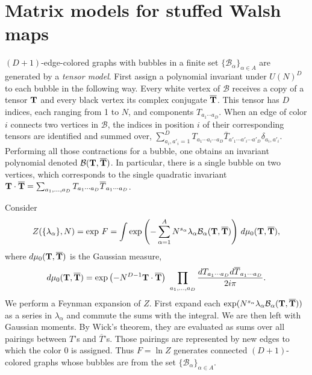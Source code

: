 \documentclass[aps,prd,10pt,notitlepage,nofootinbib,superscriptaddress,showkeys,showpacs]{revtex4-1}
\begin{document}
\section{Matrix models for stuffed Walsh maps} \label{sec:MatrixModel}

$(D+1)$-edge-colored graphs with bubbles in a finite set $\{{\mathcal{B}}_\alpha\}_{\alpha\in A}$ are generated by a \emph{tensor model}. First assign a polynomial invariant under $U(N)^D$ to each bubble in the following way. Every white vertex of ${\mathcal{B}}$ receives a copy of a tensor ${\bf T}$ and every black vertex its complex conjugate ${\bf \overline{T}}$. This tensor has $D$ indices, each ranging from 1 to $N$, and components $T_{a_1 \dotsb a_D}$. When an edge of color $i$ connects two vertices in ${\mathcal{B}}$, the indices in position $i$ of their corresponding tensors are identified and summed over, $\sum_{a_i, a'_i=1}^D T_{a_1\dotsb a_i\dotsb a_D} \bar{T}_{a'_1 \dotsb a'_i \dotsb a'_D} \delta_{a_i, a'_i}$. Performing all those contractions for a bubble, one obtains an invariant polynomial denoted ${\mathcal{B}}({\bf T}, {\bf \overline{T}})$. In particular, there is a single bubble on two vertices, which corresponds to the single quadratic invariant ${\bf T}\cdot \overline{{\bf T}} = \sum_{a_1, \dotsc, a_D} T_{a_1\dotsb a_D} \overline{T}_{a_1\dotsb a_D}$.

Consider
\begin{equation}
\label{eqref:ArbTensZ}
Z(\{\lambda_\alpha\},N) = \exp\,F = \int \exp\left( -\sum_{\alpha=1}^A N^{s_{\alpha}} \lambda_\alpha {\mathcal{B}}_\alpha({\bf T}, \overline{{\bf T}})\right)\, d\mu_0({\bf T}, \overline{{\bf T}}),
\end{equation}
where $d\mu_0({\bf T}, \overline{{\bf T}})$ is the Gaussian measure,
\begin{equation}
\label{eqref:gaussianmeasure}
d\mu_0({\bf T}, \overline{{\bf T}}) = \exp \left(- N^{D-1} {\bf T}\cdot \overline{{\bf T}}\right)\ \prod_{a_1, \dotsc, a_D} \frac{dT_{a_1 \dotsb a_D} d\overline{T}_{a_1 \dotsb a_D}}{2i \pi}.
\end{equation}
We perform a Feynman expansion of $Z$. First expand each $\exp(N^{s_{\alpha}} \lambda_\alpha {\mathcal{B}}_\alpha({\bf T}, \overline{{\bf T}}))	$ as a series in $\lambda_\alpha$ and commute the sums with the integral. We are then left with Gaussian moments. By Wick's theorem, they are evaluated as sums over all pairings between $T$'s and $\overline{T}$'s. Those pairings are represented by new edges to which the color 0 is assigned. Thus $F = \ln Z$ generates connected $(D+1)$-colored graphs whose bubbles are from the set $\{{\mathcal{B}}_\alpha\}_{\alpha\in A}$.
\end{document}
